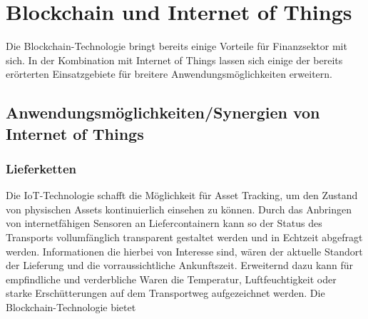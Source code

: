 \section{Blockchain und Internet of Things}
Die Blockchain-Technologie bringt bereits einige Vorteile für Finanzsektor mit sich.
In der Kombination mit Internet of Things lassen sich einige der bereits erörterten Einsatzgebiete
für breitere Anwendungsmöglichkeiten erweitern.

\subsection{Anwendungsmöglichkeiten/Synergien von Internet of Things}

\subsubsection{Lieferketten}
Die IoT-Technologie schafft die Möglichkeit für Asset Tracking, um den Zustand von physischen Assets
kontinuierlich einsehen zu können. Durch das Anbringen von internetfähigen Sensoren an 
Liefercontainern kann so der Status des Transports vollumfänglich transparent gestaltet
werden und in Echtzeit abgefragt werden. 
Informationen die hierbei von Interesse sind, wären der aktuelle Standort der Lieferung und
die vorraussichtliche Ankunftszeit. Erweiternd dazu kann für empfindliche und 
verderbliche Waren die Temperatur, Luftfeuchtigkeit oder starke Erschütterungen auf dem 
Transportweg aufgezeichnet werden.
Die Blockchain-Technologie bietet 

\cite[p.~169f]{chowdhary2025smart}

